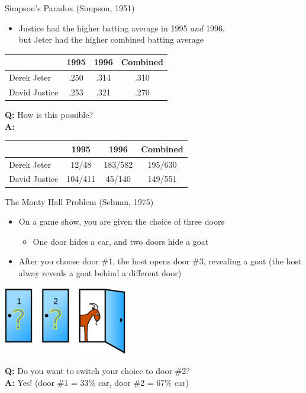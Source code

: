 \documentclass[handout]{beamer}
\begin{document}
  \begin{frame}{Simpson's Paradox (Simpson, 1951)}
    \begin{itemize}
      \item Justice had the higher batting average in 1995 {\it and} 1996,\\but Jeter had the higher combined batting average
    \end{itemize}
    \begin{center}
      \begin{tabular}{l|cc|c}
                      & 1995  & 1996  & Combined\\
                      \hline
        Derek Jeter   & .250  & .314  & .310\\
        David Justice & .253  & .321  & .270
      \end{tabular}
    \end{center}
    {\bf Q:} How is this possible?\\
    \pause
    {\bf A:}
    \begin{center}
      \begin{tabular}{l|cc|c}
                      & 1995  & 1996  & Combined\\
                      \hline
        Derek Jeter   & 12/48   & 183/582 & 195/630\\
        David Justice & 104/411 & 45/140  & 149/551
      \end{tabular}
    \end{center}
  \end{frame}

  \begin{frame}{The Monty Hall Problem (Selman, 1975)}
    \begin{itemize}
      \item On a game show, you are given the choice of three doors
      \begin{itemize}
        \item One door hides a car, and two doors hide a goat
      \end{itemize}
      \item After you choose door \#1, the host opens door \#3, revealing a goat (the host alway reveals a goat behind a different door)
    \end{itemize}
    \begin{center}
      \includegraphics[height = 3cm]{images/monty_hall.png}
    \end{center}
    {\bf Q:} Do you want to switch your choice to door \#2?\\
    \pause
    {\bf A:} Yes! (door \#1 = 33\% car, door \#2 = 67\% car)
  \end{frame}
\end{document}
